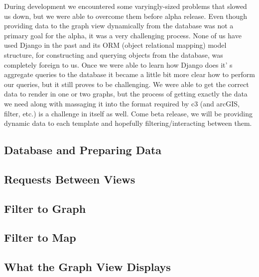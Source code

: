 \documentclass[10pt,peerreview,onecolumn,draftclsnofoot,technote]{IEEEtran}
\begin{document}
During development we encountered some varyingly-sized problems that slowed us down, but we were able to overcome them before alpha release.
Even though providing data to the graph view dynamically from the database was not a primary goal for the alpha, it was a very challenging process.
None of us have used Django in the past and its ORM (object relational mapping) model structure, for constructing and querying objects from the database, was completely foreign to us.
Once we were able to learn how Django does it’ s aggregate queries to the database it became a little bit more clear how to perform our queries, but it still proves to be challenging.
We were able to get the correct data to render in one or two graphs, but the process of getting exactly the data we need along with massaging it into the format required by c3 (and arcGIS, filter, etc.) is a challenge in itself as well.
Come beta release, we will be providing dynamic data to each template and hopefully filtering/interacting between them.

\subsection{Database and Preparing Data}


\subsection{Requests Between Views} %

\subsection{Filter to Graph} %

\subsection{Filter to Map}

\subsection{What the Graph View Displays}
\end{document}
